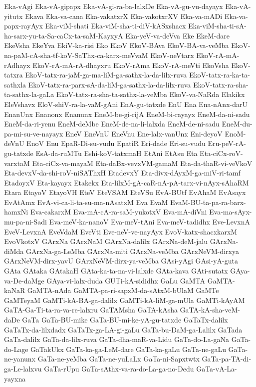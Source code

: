 {Eka-vAgi
Eka-vA-gipapx
Eka-vA-gi-ra-ba-lalxDe
Eka-vA-gu-vu-dayayx
Eka-vA-yitutx
Ekava
Eka-va-cana
Eka-vakatxrX
Eka-vakotxrXV
Eka-va-mADi
Eka-va-papx-rayAyx
Eka-viM-shati
Eka-viM-sha-ti-diV-kASxshacx
Eka-viM-sha-ti-sA-ha-sarx-yu-ta-Sa-caCx-ta-saM-KayxyA
Eka-yeV-va-deVva
Eke
EkeM-dare
EkeVsha
EkeYva
EkiV-ka-risi
Eko
EkoV
EkoV-BAva
EkoV-BA-va-veMba
EkoV-na-paM-cA-sha-tf-koV-SaThx-ca-karx-meVvaM
EkoV-neVtarx
EkoV-rA-mA-rAdhayx
EkoV-rA-mA-rA-dhayxru
EkoV-rAma
EkoV-rA-meVti
EkoVsha
EkoV-tatxra
EkoV-tatx-ra-jaM-ga-ma-liM-ga-sathx-la-da-lilx-ruva
EkoV-tatx-ra-ka-ta-sathxla
EkoV-tatx-ra-parx-sA-da-liM-ga-sathx-la-da-lilx-ruva
EkoV-tatx-ra-sha-ta-sathx-la-gaLa
EkoV-tatx-ra-sha-ta-sathx-la-veMba
EkoV-va-NaRda
Elakikx
EleVshavx
EloV-shiV-ra-la-vaM-gAni
EnA-gu-tatxde
EnU
Ena
Ena-nAnx-darU
EnanUnx
Enanonx
Enanunx
EneM-be-gi-rijA
EneM-bi-rayayx
EneM-da-ni-sadu
EneM-da-ri-yenu
EneM-deMbe
EneM-de-na-li-lalxda
EneM-de-ni-sadu
EneM-du-pa-mi-su-ve-nayayx
EneV
EneVnU
EneVnu
Ene-lalx-vanUnx
Eni-deyoV
EnoM-deVnU
EnoV
Enu
EpaR-Di-su-vudu
EpatiR
Eri-dade
Eri-su-vudu
Eru-peV-rA-gu-tatxde
EsA-da-ruMTu
Eshi-koV-tatxmaH
EtAni
EtAsu
Eta
Eta-ciCx-roV-varxtaM
Eta-ciCx-va-mayaM
Eta-daBx-vevxVM-gamaM
Eta-da-thaR-vi-veVkoV
Eta-devxV-da-shi-roV-niSAThxH
EtadevxY
Eta-divx-dAyxM-ga-miV-ri-tamf
EtadoyxV
Eta-kayayx
Etakekx
Eta-lilxM-gA-caR-nA-pA-tarx-vi-nAyx-sAhaRM
Etara
EtayoV
EtayoVH
EteV
EteVSAM
EteVSu
EvA-BUtf
EvAhaM
EvAsayx
EvAtAmx
EvA-vi-ca-li-ta-su-ma-nAsatxM
Eva
EvaM
EvaM-BU-ta-pa-ra-barx-hamxNi
Eva-cakarxM
Eva-mA-cA-ra-saM-yukotxV
Eva-mA-diVni
Eva-ma-sAyx-mu-pa-ni-Sadi
Eva-meV-ka-nanoV
Eva-meV-tAni
Eva-meV-tadidhx
Eve-LevxnA
EveV-LevxnA
EveVdaM
EveVti
Eve-neV-ve-nayAyx
EvoV-katx-shacxkarxM
EvoVkotxV
GArxNa
GArxNaM
GArxNa-dalilx
GArxNa-deM-jalu
GArxNa-diMda
GArxNa-ga-LeMba
GArxNa-miti
GArxNa-veMba
GArxNeVM-dirxya
GArxNeVM-dirx-yavU
GArxNeVM-dirx-ya-veMba
GAsi-yAgi
GAsi-yA-guta
GAta
GAtaka
GAtakaH
GAta-ka-ta-na-vi-lalxde
GAta-kava
GAti-sutatx
GAya-va-De-daMge
GAya-vi-lalx-duda
GUTi-kA-sididhx
GaLu
GaMTA
GaMTA-kaNaR
GaMTA-nAda
GaMTA-pa-ri-sapxM-da-sAtxM-bUlaM
GaMTe
GaMTeyaM
GaMTi-kA-BA-ga-dalilx
GaMTi-kA-liM-ga-mUla
GaMTi-kAyAM
GaTA-Ga-Ti-ta-ra-va-re-lalxru
GaTAMsha
GaTA-kAsha
GaTA-kA-sha-veM-daDe
GaTa
GaTa-BU-mike
GaTa-BU-mi-ke-yA-gu-tatxde
GaTaTx-dalilx
GaTaTx-da-lilxdadx
GaTaTx-ga-LA-gi-gaLu
GaTa-bu-DaM-ga-Lalilx
GaTada
GaTa-dalilx
GaTa-da-lilx-ruva
GaTa-dha-maR-va-Lidu
GaTa-do-La-gaNa
GaTa-do-Lage
GaTakUkx
GaTa-ka-ga-LeM-dare
GaTa-ka-gaLu
GaTa-ne-gaLu
GaTa-ne-yanunx
GaTa-ne-yeMba
GaTa-ne-yuLaLx
GaTa-ni-Sapxtwtx
GaTa-pa-TA-di-ga-Le-lalxvu
GaTa-rUpu
GaTa-sAthx-va-ra-do-La-ga-no-Dedu
GaTa-vA-La-yayxna
}
